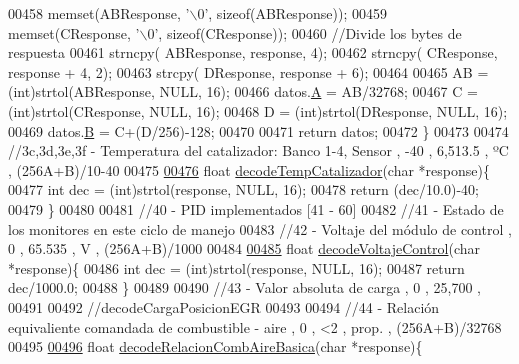 \begin{DoxyCode}
{{{{{{{00458     memset(ABResponse, \textcolor{charliteral}{'\(\backslash\)0'}, \textcolor{keyword}{sizeof}(ABResponse));
00459     memset(CResponse, \textcolor{charliteral}{'\(\backslash\)0'}, \textcolor{keyword}{sizeof}(CResponse));
00460     \textcolor{comment}{//Divide los bytes de respuesta}
00461     strncpy( ABResponse, response, 4);
00462     strncpy( CResponse, response + 4, 2);
00463     strcpy( DResponse, response + 6);
00464 
00465     AB = (int)strtol(ABResponse, NULL, 16);
00466     datos.\hyperlink{structOxigenoResponse_a068c403e5746226cf22bb020b4c786d3}{A} = AB/32768;
00467     C = (int)strtol(CResponse, NULL, 16);
00468     D = (int)strtol(DResponse, NULL, 16);
00469     datos.\hyperlink{structOxigenoResponse_a96b19152dd001e19d1351e2d97f22736}{B} = C+(D/256)-128; 
00470     
00471     \textcolor{keywordflow}{return} datos;
00472 \}
00473 
00474 \textcolor{comment}{//3c,3d,3e,3f - Temperatura del catalizador: Banco 1-4, Sensor , -40 , 6,513.5 , ºC , (256A+B)/10-40 }
00475 
\hyperlink{decoders_8hpp_a8251853ca2e5b8b2e88c75f50d53bc8d}{00476} \textcolor{keywordtype}{float} \hyperlink{decoders_8cpp_a8251853ca2e5b8b2e88c75f50d53bc8d}{decodeTempCatalizador}(\textcolor{keywordtype}{char} *response)\{
00477     \textcolor{keywordtype}{int} dec = (int)strtol(response, NULL, 16);
00478     \textcolor{keywordflow}{return} (dec/10.0)-40;
00479 \}
00480 
00481 \textcolor{comment}{//40 - PID implementados [41 - 60]}
00482 \textcolor{comment}{//41 - Estado de los monitores en este ciclo de manejo }
00483 \textcolor{comment}{//42 - Voltaje del módulo de control , 0 , 65.535 , V , (256A+B)/1000 }
00484 
\hyperlink{decoders_8hpp_a5937fc059394faad8c9c96a0b27a8796}{00485} \textcolor{keywordtype}{float} \hyperlink{decoders_8cpp_a5937fc059394faad8c9c96a0b27a8796}{decodeVoltajeControl}(\textcolor{keywordtype}{char} *response)\{
00486     \textcolor{keywordtype}{int} dec = (int)strtol(response, NULL, 16);
00487     \textcolor{keywordflow}{return} dec/1000.0;
00488 \}
00489 
00490 \textcolor{comment}{//43 - Valor absoluta de carga , 0 , 25,700 , %
00491 
00492 \textcolor{comment}{//decodeCargaPosicionEGR}
00493 
00494 \textcolor{comment}{//44 - Relación equivaliente comandada de combustible - aire , 0 , <2 , prop. , (256A+B)/32768 }
00495 
\hyperlink{decoders_8hpp_ade77bb9f8d8a2ba3aa431cdf9bdd0c32}{00496} \textcolor{keywordtype}{float} \hyperlink{decoders_8cpp_ade77bb9f8d8a2ba3aa431cdf9bdd0c32}{decodeRelacionCombAireBasica}(\textcolor{keywordtype}{char} *response)\{
}}}}}}}}
\end{DoxyCode}
